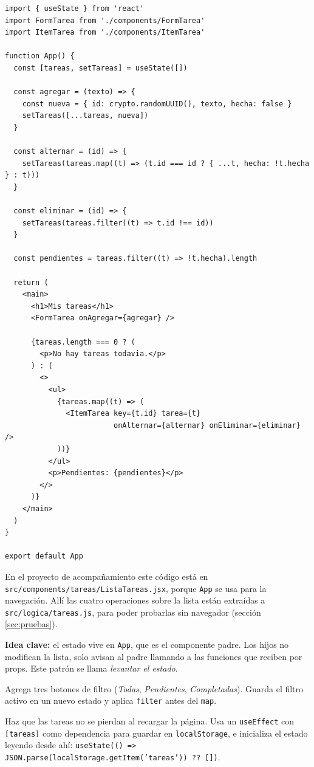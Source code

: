 \documentclass[11pt,a4paper]{article}
\newcommand{\cmd}[1]{\texttt{\color{reactdark}#1}}
\begin{document}
\begin{lstlisting}[language=JSX,title={\small\ttfamily src/App.jsx}]
import { useState } from 'react'
import FormTarea from './components/FormTarea'
import ItemTarea from './components/ItemTarea'

function App() {
  const [tareas, setTareas] = useState([])

  const agregar = (texto) => {
    const nueva = { id: crypto.randomUUID(), texto, hecha: false }
    setTareas([...tareas, nueva])
  }

  const alternar = (id) => {
    setTareas(tareas.map((t) => (t.id === id ? { ...t, hecha: !t.hecha } : t)))
  }

  const eliminar = (id) => {
    setTareas(tareas.filter((t) => t.id !== id))
  }

  const pendientes = tareas.filter((t) => !t.hecha).length

  return (
    <main>
      <h1>Mis tareas</h1>
      <FormTarea onAgregar={agregar} />

      {tareas.length === 0 ? (
        <p>No hay tareas todavia.</p>
      ) : (
        <>
          <ul>
            {tareas.map((t) => (
              <ItemTarea key={t.id} tarea={t}
                         onAlternar={alternar} onEliminar={eliminar} />
            ))}
          </ul>
          <p>Pendientes: {pendientes}</p>
        </>
      )}
    </main>
  )
}

export default App
\end{lstlisting}

En el proyecto de acompañamiento este código está en \cmd{src/components/tareas/ListaTareas.jsx}, porque \cmd{App} se usa para la navegación. Allí las cuatro operaciones sobre la lista están extraídas a \cmd{src/logica/tareas.js}, para poder probarlas sin navegador (sección \ref{sec:pruebas}).

\textbf{Idea clave:} el estado vive en \cmd{App}, que es el componente padre. Los hijos no modifican la lista, solo avisan al padre llamando a las funciones que reciben por props. Este patrón se llama \emph{levantar el estado}.

\begin{ejercicio}[1]
Agrega tres botones de filtro (\emph{Todas}, \emph{Pendientes}, \emph{Completadas}). Guarda el filtro activo en un nuevo estado y aplica \cmd{filter} antes del \cmd{map}.
\end{ejercicio}

\begin{ejercicio}[2]
Haz que las tareas no se pierdan al recargar la página. Usa un \cmd{useEffect} con \cmd{[tareas]} como dependencia para guardar en \cmd{localStorage}, e inicializa el estado leyendo desde ahí:
\cmd{useState(() => JSON.parse(localStorage.getItem('tareas')) ?? [])}.
\end{ejercicio}
\end{document}
